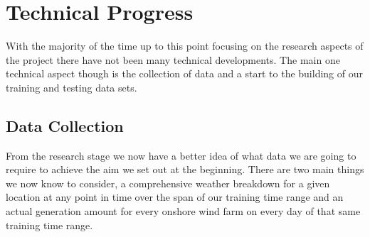 \documentclass[twoside]{article}
\begin{document}
\section{Technical Progress}
With the majority of the time up to this point focusing on the research aspects of the project there have not been many technical developments. The main one technical aspect though is the collection of data and a start to the building of our training and testing data sets. 

\subsection{Data Collection}
From the research stage we now have a better idea of what data we are going to require to achieve the aim we set out at the beginning. There are two main things we now know to consider, a comprehensive weather breakdown for a given location at any point in time over the span of our training time range and an actual generation amount for every onshore wind farm on every day of that same training time range.
\end{document}
